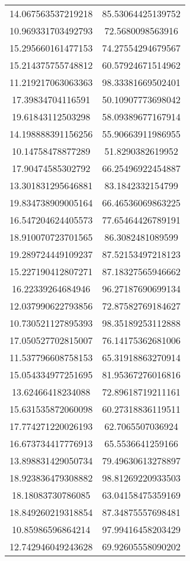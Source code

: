 \begin{table}
\begin{tabular}{cc}
14.067563537219218 & 85.53064425139752 \\
10.969331703492793 & 72.5680098563916 \\
15.295660161477153 & 74.27554294679567 \\
15.214375755748812 & 60.57924671514962 \\
11.219217063063363 & 98.33381669502401 \\
17.39834704116591 & 50.10907773698042 \\
19.61843112503298 & 58.09389677167914 \\
14.198888391156256 & 55.90663911986955 \\
10.14758478877289 & 51.8290382619952 \\
17.90474585302792 & 66.25496922454887 \\
13.301831295646881 & 83.1842332154799 \\
19.834738909005164 & 66.46536069863225 \\
16.547204624405573 & 77.65464426789191 \\
18.910070723701565 & 86.3082481089599 \\
19.289724449109237 & 87.52153497218123 \\
15.227190412807271 & 87.18327565946662 \\
16.22339264684946 & 96.27187690699134 \\
12.037990622793856 & 72.87582769184627 \\
10.730521127895393 & 98.35189253112888 \\
17.050527702815007 & 76.14175362681006 \\
11.537796608758153 & 65.31918863270914 \\
15.054334977251695 & 81.95367276016816 \\
13.62466418234088 & 72.89618719211161 \\
15.631535872060098 & 60.27318836119511 \\
17.774271220026193 & 62.7065507036924 \\
16.673734417776913 & 65.5536641259166 \\
13.898831429050734 & 79.49630613278897 \\
18.923836479308882 & 98.81269220933503 \\
18.18083730786085 & 63.04158475359169 \\
18.849260219318854 & 87.34875557698481 \\
10.85986596864214 & 97.99416458203429 \\
12.742946049243628 & 69.92605558090202 \\

\end{tabular}
\end{table}
